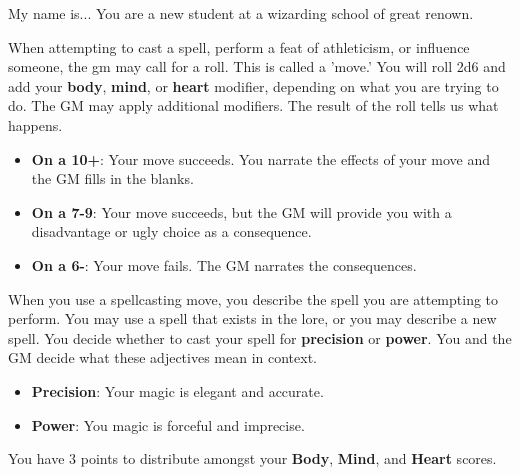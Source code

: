 \documentclass[10pt,twoside,twocolumn]{article}
\begin{document}
    \begin{charactersheet}{My name is... \underline{\hspace{4cm}}}
    	You are a new student at a wizarding school of great renown.

		When attempting to cast a spell, perform a feat of athleticism, or influence someone, the gm may call for a roll.
		This is called a 'move.'
		You will roll 2d6 and add your {\bf body}, {\bf mind}, or {\bf heart} modifier, depending on what you are trying to do.
		The GM may apply additional modifiers.
		The result of the roll tells us what happens.
		
		\begin{itemize}
			\item {\bf On a 10+}: Your move succeeds. You narrate the effects of your move and the GM fills in the blanks.
			\item {\bf On a 7-9}: Your move succeeds, but the GM will provide you with a disadvantage or ugly choice as a consequence.
			\item {\bf On a 6-}: Your move fails. The GM narrates the consequences.
		\end{itemize}



		When you use a spellcasting move, you describe the spell you are attempting to perform. 
		You may use a spell that exists in the lore, or you may describe a new spell.
		You decide whether to cast your spell for {\bf precision} or {\bf power}.
		You and the GM decide what these adjectives mean in context.
		\begin{itemize}
			\item {\bf Precision}: Your magic is elegant and accurate.
			\item {\bf Power}: You magic is forceful and imprecise.
		\end{itemize}
	
		You have 3 points to distribute amongst your {\bf Body}, {\bf Mind}, and {\bf Heart} scores.


\end{charactersheet}
\end{document}
